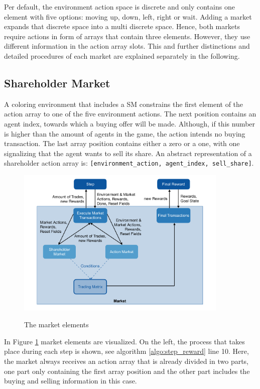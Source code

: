 Per default, the environment action space is discrete and only contains one element with five options: moving up, down, left, right or wait. Adding a market expands that discrete space into a multi discrete space. Hence, both markets require actions in form of arrays that contain three elements. However, they use different information in the action array slots. This and further distinctions and detailed procedures of each market are explained separately in the following.

\subsection{Shareholder Market}\label{shareholder_market}
A coloring environment that includes a SM constrains the first element of the action array to one of the five environment actions. The next position contains an agent index, towards which a buying offer will be made. Although, if this number is higher than the amount of agents in the game, the action intends no buying transaction. The last array position contains either a zero or a one, with one signalizing that the agent wants to sell its share. An abstract representation of a shareholder action array is: \verb|[environment_action, agent_index, sell_share]|.

\begin{figure}[hpbt]
    \centering
    \includegraphics[width=0.9\textwidth]{pictures/market}\\
    \caption[Market Elements]{The market elements}\label{fig:market}
\end{figure}

In Figure \ref{fig:market} market elements are visualized. On the left, the process that takes place during each step is shown, see algorithm \ref{algo:step_reward} line 10. Here, the market always receives an action array that is already divided in two parts, one part only containing the first array position and the other part includes the buying and selling information in this case.

